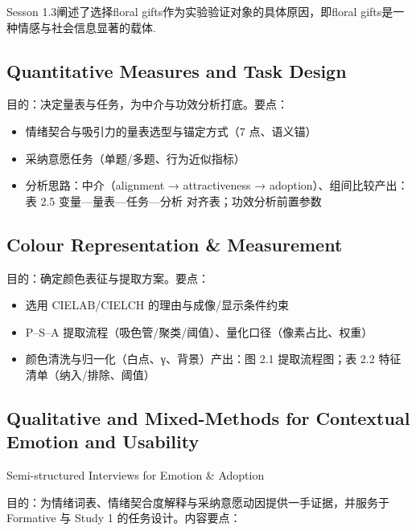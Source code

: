Sesson 1.3阐述了选择floral gifts作为实验验证对象的具体原因，即floral gifts是一种情感与社会信息显著的载体.

\subsection{Quantitative Measures and Task Design}

目的：决定量表与任务，为中介与功效分析打底。要点：

\begin{itemize}

  \item 情绪契合与吸引力的量表选型与锚定方式（7 点、语义锚）

  \item 采纳意愿任务（单题/多题、行为近似指标）

  \item 分析思路：中介（alignment → attractiveness → adoption）、组间比较产出：表 2.5 变量—量表—任务—分析 对齐表；功效分析前置参数

\end{itemize}

\subsection{Colour Representation \& Measurement}

目的：确定颜色表征与提取方案。要点：

\begin{itemize}

  \item 选用 CIELAB/CIELCH 的理由与成像/显示条件约束

  \item P–S–A 提取流程（吸色管/聚类/阈值）、量化口径（像素占比、权重）

  \item 颜色清洗与归一化（白点、γ、背景）产出：图 2.1 提取流程图；表 2.2 特征清单（纳入/排除、阈值）

\end{itemize}

\subsection{Qualitative and Mixed-Methods for Contextual Emotion and Usability}

Semi-structured Interviews for Emotion \& Adoption

目的：为情绪词表、情绪契合度解释与采纳意愿动因提供一手证据，并服务于 Formative 与 Study 1 的任务设计。内容要点：

